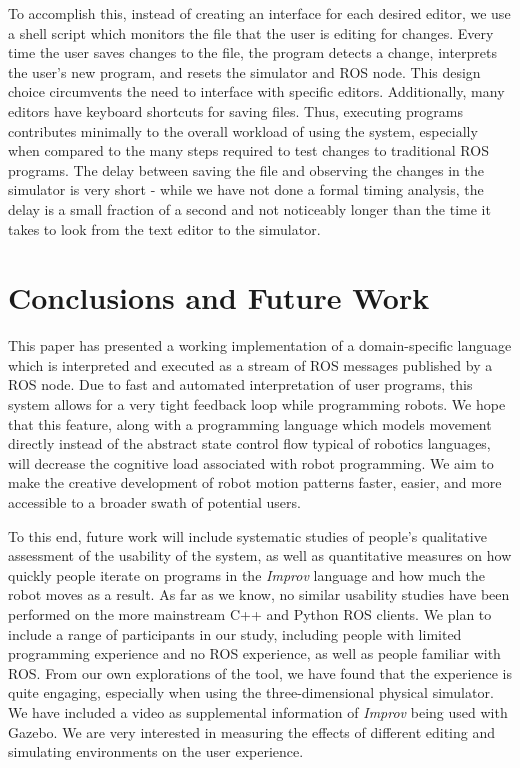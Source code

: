\documentclass[sigconf]{acmart}
\begin{document}
To accomplish this, instead of creating an interface for each desired
editor, we use a shell script which monitors the file that the user is
editing for changes. Every time the user saves changes to the file, the
program detects a change, interprets the user's new program, and resets
the simulator and ROS node. This design choice circumvents the need to
interface with specific editors. Additionally, many editors have
keyboard shortcuts for saving files. Thus, executing programs
contributes minimally to the overall workload of using the system,
especially when compared to the many steps required to test changes to
traditional ROS programs. The delay between saving the file and observing the
changes in the simulator is very short - while we have not done a formal timing
analysis, the delay is a small fraction of a second and not noticeably longer than the
time it takes to look from the text editor to the simulator.

\section{Conclusions and Future
Work}\label{conclusions-and-future-work}

This paper has presented a working implementation of a domain-specific
language which is interpreted and executed as a stream of ROS messages published
by a ROS node. Due to fast and automated interpretation of user programs, this system allows for a very tight
feedback loop while programming robots. We hope that this feature,
along with a programming language which models movement directly instead of the
abstract state control flow typical of robotics languages, will decrease the
cognitive load associated with robot programming. We aim to make the creative
development of robot motion patterns faster, easier, and more accessible to a
broader swath of potential users.


To this end, future work will include systematic studies of people's qualitative
assessment of the usability of the system, as well as quantitative measures on
how quickly people iterate on programs in the \emph{Improv} language and how much the
robot moves as a result. As far as we know, no similar usability studies have
been performed on the more mainstream C++ and Python ROS clients. We plan to
include a range of participants in our study, including people with limited
programming experience and no ROS experience, as well as people familiar with
ROS. From our own explorations of the tool, we have found that the
experience is quite engaging, especially when using the three-dimensional
physical simulator. We have included a video as supplemental information of
\emph{Improv} being used with Gazebo. We are very interested in measuring the effects of different
editing and simulating environments on the user experience.
\end{document}
